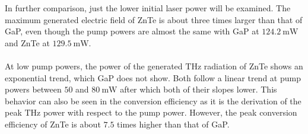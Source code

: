 In further comparison, just the lower initial laser power will be examined.
The maximum generated electric field of ZnTe is about three times larger than that of GaP, even though the pump powers are almost the same with GaP at $\SI{124.2}{\milli\W}$ and ZnTe at $\SI{129.5}{\milli\W}$.
\\\\
At low pump powers, the power of the generated $\si{\tera\hertz}$ radiation of ZnTe shows an exponential trend, which GaP does not show.
Both follow a linear trend at pump powers between $50$ and $\SI{80}{\milli\W}$ after which both of their slopes lower.
This behavior can also be seen in the conversion efficiency as it is the derivation of the peak $\si{\tera\hertz}$ power with respect to the pump power.
However, the peak conversion efficiency of ZnTe is about $7.5$ times higher than that of GaP. 